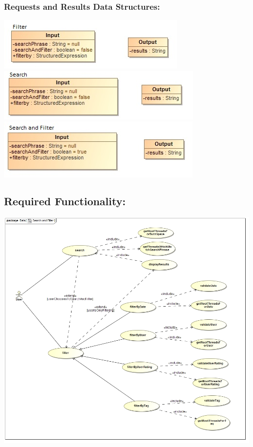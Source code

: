 \documentclass[a4paper,11pt]{article}
\begin{document}
\subsubsection*{Requests and Results Data Structures:}
\includegraphics{Images/SearchAndFilter/Filter_input_output}\\
\includegraphics{Images/SearchAndFilter/Search_Input_output}\\
\includegraphics{Images/SearchAndFilter/SearchAndFilter_input_output}\\
\subsection{Required Functionality:} 
\includegraphics{Images/SearchAndFilter/SearchAndFilter_usecase}\\
\end{document}
